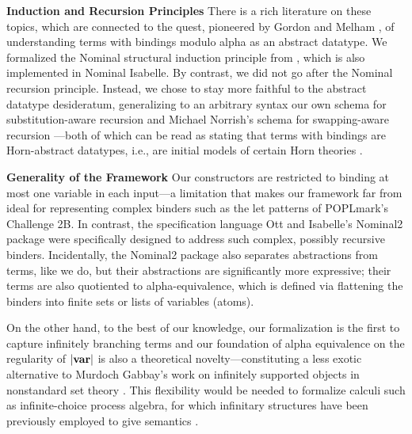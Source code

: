 \documentclass{llncs}
\begin{document}
{\bf Induction and Recursion Principles}   
% 
There is a rich literature on these topics, which are connected to the quest, 
pioneered by 
Gordon and Melham \cite{gor-5axAlpha}, 
of understanding terms with bindings modulo alpha as an abstract datatype. 
We formalized the Nominal structural induction principle 
from \cite{pitts-AlphaStructural}, which is also implemented in Nominal Isabelle. 
By contrast, we did not go after 
the Nominal recursion principle. Instead, we chose to stay more faithful to the 
abstract datatype desideratum,  
generalizing to an arbitrary syntax 
our own schema for substitution-aware recursion \cite{pop-recPrin} and  
Michael Norrish's schema for swapping-aware recursion \cite{norrish-MechanisingLambdaInFirstOrder}---both 
of which can be read as stating that terms with bindings are Horn-abstract datatypes, i.e., 
are initial models of certain Horn theories 
\cite[\S3,\S8]{pop-recPrin}. 
 

{\bf Generality of the Framework} 
%
Our constructors are restricted to binding at most one variable 
in each input---a limitation that makes our framework far from ideal for representing 
complex binders such as the let patterns of POPLmark's Challenge 2B.     
In contrast, the specification language Ott \cite{ott-tool} 
and 
Isabelle's Nominal2 package \cite{urbanGeneralBinders} were specifically designed 
to address such complex, possibly recursive binders.  
Incidentally, the Nominal2 package also separates abstractions from terms, like we do, but their abstractions 
are significantly more expressive; their terms are also quotiented to  
alpha-equivalence, which is defined via flattening the binders into 
finite sets or lists of variables (atoms).   
      
On the other hand, to the best of our knowledge, our formalization is the first to capture infinitely branching terms 
and our foundation of alpha equivalence on the regularity of $|\mbox{\bf var}|$ 
is also a theoretical novelty---constituting a less exotic alternative 
to Murdoch Gabbay's work on infinitely supported objects in nonstandard set theory \cite{Gabbay:2007}.
This flexibility would be needed to formalize 
calculi such as  
infinite-choice process algebra, for which 
infinitary structures 
have been previously employed to give semantics \cite{Lut02}.
\end{document}
